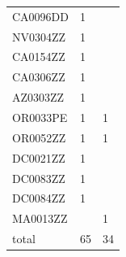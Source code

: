 \documentclass[12pt]{article}
\begin{document}
\begin{longtable}{lll}
CA0096DD         & 1             &          \\
NV0304ZZ         & 1             &          \\
CA0154ZZ         & 1             &          \\
CA0306ZZ         & 1             &          \\
AZ0303ZZ         & 1             &          \\
OR0033PE         & 1             & 1        \\
OR0052ZZ         & 1             & 1        \\
DC0021ZZ         & 1             &          \\
DC0083ZZ         & 1             &          \\
DC0084ZZ         & 1             &          \\
MA0013ZZ         &               & 1        \\
\hline
total            & 65            & 34       \\
\hline
\end{longtable}
\FloatBarrier
\end{document}
